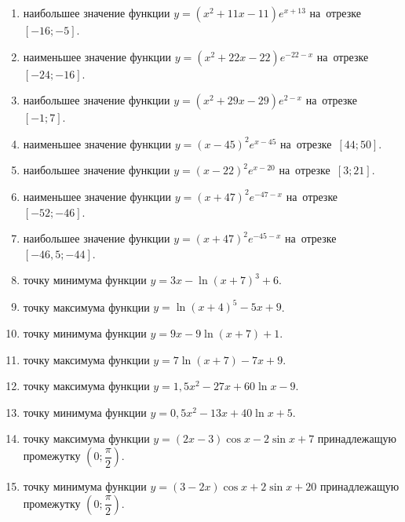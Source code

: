 \documentclass[a4paper,10pt]{article}
\begin{document}
\begin{enumerate}
\item {} наибольшее значение функции $y=\left(x^2 +11x -11\right)e^{x+13}$ на~отрезке~$\left[-16;-5\right]$.

\item {} наименьшее значение функции $y=\left(x^2 +22x -22\right)e^{-22-x}$ на~отрезке~$\left[-24;-16\right]$.

\item {} наибольшее значение функции $y=\left(x^2 +29x -29\right)e^{2-x}$ на~отрезке~$\left[-1;7\right]$.

\item {} наименьшее значение функции $y=\left(x-45\right)^2e^{x-45}$ на~отрезке~$\left[44;50\right]$.

\item {} наибольшее значение функции $y=\left(x-22\right)^2e^{x-20}$ на~отрезке~$\left[3;21\right]$.

\item {} наименьшее значение функции $y=\left(x+47\right)^2e^{-47-x}$ на~отрезке~$\left[-52;-46\right]$.

\item {} наибольшее значение функции $y=\left(x+47\right)^2e^{-45-x}$ на~отрезке~$\left[-46,5;-44\right]$.

\item {} точку минимума функции $y=3x-\ln\left(x+7\right)^{3}+6$.

\item {} точку максимума функции $y=\ln\left(x+4\right)^{5}-5x+9$.

\item {} точку минимума функции $y=9x-9\ln\left(x+7\right)+1$.

\item {} точку максимума функции $y=7\ln\left(x+7\right)-7x+9$.

\item {} точку максимума функции $y=1,5x^2-27x+60\ln x -9$.

\item {} точку минимума функции $y=0,5x^2-13x+40\ln x +5$.

\item {} точку максимума функции $y=\left(2x-3\right)\cos x -2\sin x+7$
принадлежащую промежутку $\left(0;\dfrac{\pi}{2}\right)$.

\item {} точку минимума функции $y=\left(3-2x\right)\cos x +2\sin x+20$
принадлежащую промежутку $\left(0;\dfrac{\pi}{2}\right)$.


\end{enumerate}
\end{document}
